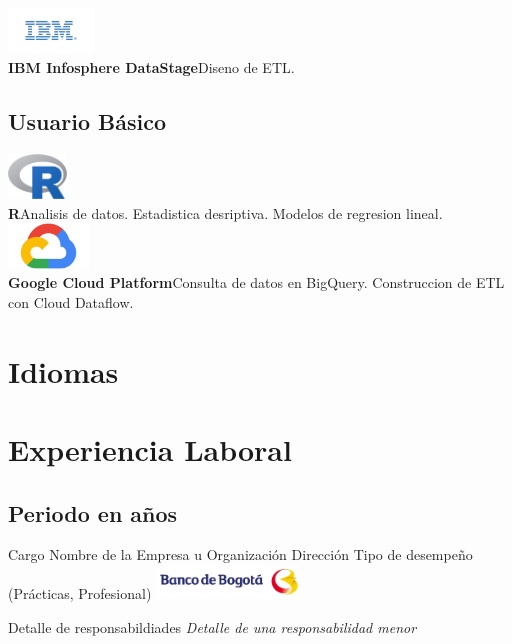 \documentclass[10pt,letter,sans]{moderncv}
\begin{document}
  \cvdoubleitem %
 {\includegraphics[height=1.2cm]{img/ibm02.png} \\ 
 	\textbf{IBM Infosphere DataStage}}{Diseno de ETL. }
 {}{}
\subsection{Usuario Básico}

\cvdoubleitem %
{\includegraphics[height=1.2cm]{img/r01.png} \\ 
	\textbf{R}}{Analisis de datos. Estadistica desriptiva. Modelos de regresion lineal.}
{\includegraphics[height=1.2cm]{img/gcp01.png} \\ 
	\textbf{Google Cloud Platform}}{Consulta de datos en BigQuery. Construccion de ETL con Cloud Dataflow. }
 
\section{Idiomas}
 
 
\section{Experiencia Laboral}
 
\subsection{Periodo en años}
 
{Cargo} %
{Nombre de la Empresa u Organización} %
{Dirección}
{Tipo de desempeño (Prácticas, Profesional)} %
{\vspace{0.15cm}
  \includegraphics[height=0.9cm]{img/bdb.png} %
  \vspace{0.15cm}}
 
\cvitem{}
{Detalle de responsabildiades} %
\cvitem{}
{\textit{Detalle de una responsabilidad menor}}
 
\end{document}

